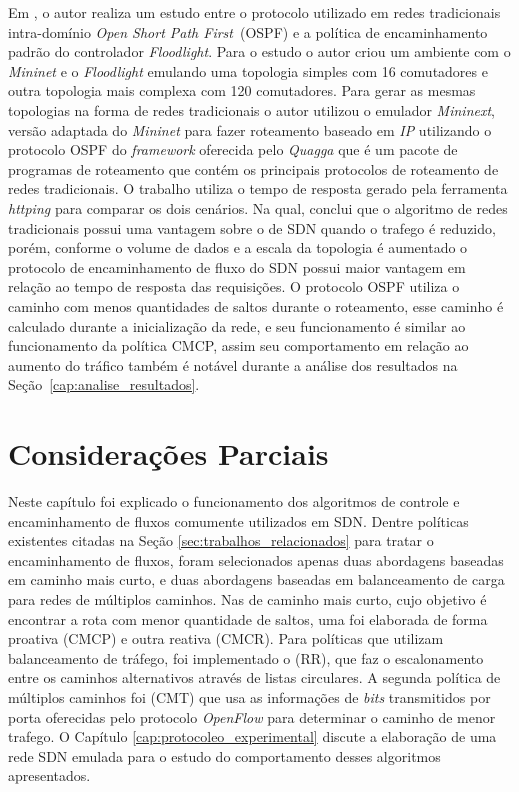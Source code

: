 Em \cite{zhang2015performance}, o autor realiza um estudo entre o protocolo utilizado em redes tradicionais intra-domínio \textit{Open Short Path First}~(OSPF) e a política de encaminhamento padrão do controlador \textit{Floodlight}. Para o estudo o autor criou um ambiente com o \textit{Mininet} e o \textit{Floodlight} emulando uma topologia simples com 16 comutadores e outra topologia mais complexa com 120 comutadores. Para gerar as mesmas topologias na forma de redes tradicionais o autor utilizou o emulador \textit{Mininext}, versão adaptada do \textit{Mininet} para fazer roteamento baseado em \textit{IP} utilizando o protocolo OSPF do \textit{framework} oferecida pelo \textit{Quagga} que é um pacote de programas de roteamento que contém os principais protocolos de roteamento de redes tradicionais. O trabalho utiliza o tempo de resposta gerado pela ferramenta \textit{httping} para comparar os dois cenários. Na qual, conclui que o algoritmo de redes tradicionais possui uma vantagem sobre o de SDN quando o trafego é reduzido, porém, conforme o volume de dados e a escala da topologia é aumentado o protocolo de encaminhamento de fluxo do SDN possui maior vantagem em relação ao tempo de resposta das requisições. O protocolo OSPF utiliza o caminho com menos quantidades de saltos durante o roteamento, esse caminho é calculado durante a inicialização da rede, e seu funcionamento é similar ao funcionamento da política CMCP, assim seu comportamento em relação ao aumento do tráfico também é notável durante a análise dos resultados na Seção~\ref{cap:analise_resultados}.

\section{Considerações Parciais}
\label{sec:consideracoesparcial_cap3}
Neste capítulo foi explicado o funcionamento dos algoritmos de controle e encaminhamento de fluxos comumente utilizados em SDN. 
Dentre políticas existentes citadas na Seção \ref{sec:trabalhos_relacionados} para tratar o encaminhamento de fluxos, foram selecionados apenas duas abordagens baseadas em caminho mais curto, e duas abordagens baseadas em balanceamento de carga para redes de múltiplos caminhos. Nas de caminho mais curto, cujo objetivo é encontrar a rota com menor quantidade de saltos,  uma foi elaborada de forma proativa (CMCP) e outra reativa (CMCR). Para políticas que utilizam balanceamento de tráfego, foi implementado o (RR), que faz o escalonamento entre os caminhos alternativos através de listas circulares. A segunda política de múltiplos caminhos foi (CMT) que usa as informações de \textit{bits} transmitidos por porta oferecidas pelo protocolo \textit{OpenFlow} para determinar o caminho de menor trafego. O Capítulo \ref{cap:protocoleo_experimental} discute a elaboração de uma rede SDN emulada para o estudo do comportamento desses algoritmos apresentados.